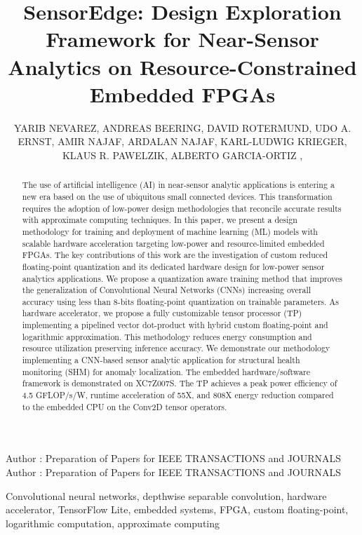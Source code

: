 \title {SensorEdge: Design Exploration Framework for Near-Sensor Analytics on Resource-Constrained Embedded FPGAs}

\author{
	\uppercase{Yarib Nevarez},
	\uppercase{Andreas Beering},	
	\uppercase{David Rotermund},
	\uppercase{Udo A. Ernst},
	\uppercase{Amir Najaf},
	\uppercase{Ardalan Najaf},
	\uppercase{Karl-Ludwig Krieger},
	\uppercase{Klaus R. Pawelzik},
	\uppercase{Alberto Garcia-Ortiz} ,
}


\markboth
{Author \headeretal: Preparation of Papers for IEEE TRANSACTIONS and JOURNALS}
{Author \headeretal: Preparation of Papers for IEEE TRANSACTIONS and JOURNALS}


\begin{abstract}
The use of artificial intelligence (AI) in near-sensor analytic applications is entering a new era based on the use of ubiquitous small connected devices. This transformation requires the adoption of low-power design methodologies that reconcile accurate results with approximate computing techniques. In this paper, we present a design methodology for training and deployment of machine learning (ML) models with scalable hardware acceleration targeting low-power and resource-limited embedded FPGAs. The key contributions of this work are the investigation of custom reduced floating-point quantization and its dedicated hardware design for low-power sensor analytics applications. We propose a quantization aware training method that improves the generalization of Convolutional Neural Networks (CNNs) increasing overall accuracy using less than 8-bits floating-point quantization on trainable parameters. As hardware accelerator, we propose a fully customizable tensor processor (TP) implementing a pipelined vector dot-product with hybrid custom floating-point and logarithmic approximation. This methodology reduces energy consumption and resource utilization preserving inference accuracy. We demonstrate our methodology implementing a CNN-based sensor analytic application for structural health monitoring (SHM) for anomaly localization. The embedded hardware/software framework is demonstrated on XC7Z007S. The TP achieves a peak power efficiency of 4.5 GFLOP/s/W, runtime acceleration of 55X, and 808X energy reduction compared to the embedded CPU on the Conv2D tensor operators.
\end{abstract}

\begin{keywords}
Convolutional neural networks, depthwise separable convolution, hardware accelerator, TensorFlow Lite, embedded systems, FPGA, custom floating-point, logarithmic computation, approximate computing
\end{keywords}

\titlepgskip=-15pt

\maketitle